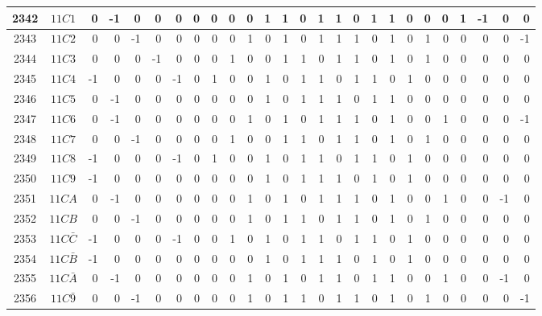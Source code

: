 \documentclass[12 pt]{article}%
\begin{document}
\begin{tiny}
\begin{centering}
\begin{longtable}{|c|c||rrrrrrrrrrrrrrrrrrrrrrrr|}
      \hline
      2342 & $11C1$ & 0 & -1 & 0 & 0 & 0 & 0 & 0 & 0 & 0 & 1 & 1 & 0 & 1 & 1 & 0 & 1 & 1 & 0 & 0 & 0 & 1 & -1 & 0 & 0 \\
      \hline
      2343 & $11C2$ & 0 & 0 & -1 & 0 & 0 & 0 & 0 & 0 & 1 & 0 & 1 & 0 & 1 & 1 & 1 & 0 & 1 & 0 & 1 & 0 & 0 & 0 & 0 & -1 \\
      \hline
      2344 & $11C3$ & 0 & 0 & 0 & -1 & 0 & 0 & 0 & 1 & 0 & 0 & 1 & 1 & 0 & 1 & 1 & 0 & 1 & 0 & 1 & 0 & 0 & 0 & 0 & 0 \\
      \hline
      2345 & $11C4$ & -1 & 0 & 0 & 0 & -1 & 0 & 1 & 0 & 0 & 1 & 0 & 1 & 1 & 0 & 1 & 1 & 0 & 1 & 0 & 0 & 0 & 0 & 0 & 0 \\
      \hline
      2346 & $11C5$ & 0 & -1 & 0 & 0 & 0 & 0 & 0 & 0 & 0 & 1 & 0 & 1 & 1 & 1 & 0 & 1 & 1 & 0 & 0 & 0 & 0 & 0 & 0 & 0 \\
      \hline
      2347 & $11C6$ & 0 & -1 & 0 & 0 & 0 & 0 & 0 & 0 & 1 & 0 & 1 & 0 & 1 & 1 & 1 & 0 & 1 & 0 & 0 & 1 & 0 & 0 & 0 & -1 \\
      \hline
      2348 & $11C7$ & 0 & 0 & -1 & 0 & 0 & 0 & 0 & 1 & 0 & 0 & 1 & 1 & 0 & 1 & 1 & 0 & 1 & 0 & 1 & 0 & 0 & 0 & 0 & 0 \\
      \hline
      2349 & $11C8$ & -1 & 0 & 0 & 0 & -1 & 0 & 1 & 0 & 0 & 1 & 0 & 1 & 1 & 0 & 1 & 1 & 0 & 1 & 0 & 0 & 0 & 0 & 0 & 0 \\
      \hline
      2350 & $11C9$ & -1 & 0 & 0 & 0 & 0 & 0 & 0 & 0 & 0 & 1 & 0 & 1 & 1 & 1 & 0 & 1 & 0 & 1 & 0 & 0 & 0 & 0 & 0 & 0 \\
      \hline
      2351 & $11CA$ & 0 & -1 & 0 & 0 & 0 & 0 & 0 & 0 & 1 & 0 & 1 & 0 & 1 & 1 & 1 & 0 & 1 & 0 & 0 & 1 & 0 & 0 & -1 & 0 \\
      \hline
      2352 & $11CB$ & 0 & 0 & -1 & 0 & 0 & 0 & 0 & 0 & 1 & 0 & 1 & 1 & 0 & 1 & 1 & 0 & 1 & 0 & 1 & 0 & 0 & 0 & 0 & 0 \\
      \hline
      2353 & $11C\bar C$ & -1 & 0 & 0 & 0 & -1 & 0 & 0 & 1 & 0 & 1 & 0 & 1 & 1 & 0 & 1 & 1 & 0 & 1 & 0 & 0 & 0 & 0 & 0 & 0 \\
      \hline
      2354 & $11C\bar B$ & -1 & 0 & 0 & 0 & 0 & 0 & 0 & 0 & 0 & 1 & 0 & 1 & 1 & 1 & 0 & 1 & 0 & 1 & 0 & 0 & 0 & 0 & 0 & 0 \\
      \hline
      2355 & $11C\bar A$ & 0 & -1 & 0 & 0 & 0 & 0 & 0 & 0 & 1 & 0 & 1 & 0 & 1 & 1 & 0 & 1 & 1 & 0 & 0 & 1 & 0 & 0 & -1 & 0 \\
      \hline
      2356 & $11C\bar9$ & 0 & 0 & -1 & 0 & 0 & 0 & 0 & 0 & 1 & 0 & 1 & 1 & 0 & 1 & 1 & 0 & 1 & 0 & 1 & 0 & 0 & 0 & 0 & -1 \\

\end{longtable}
\end{centering}
\end{tiny}
\end{document}
